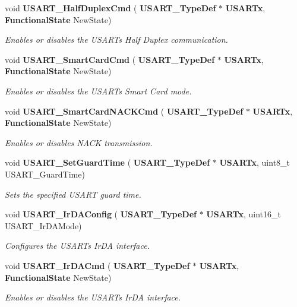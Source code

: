 \begin{DoxyCompactItemize}
void \textbf{ U\+S\+A\+R\+T\+\_\+\+Half\+Duplex\+Cmd} (\textbf{ U\+S\+A\+R\+T\+\_\+\+Type\+Def} $\ast$\textbf{ U\+S\+A\+R\+Tx}, \textbf{ Functional\+State} New\+State)
\begin{DoxyCompactList}\small\item\em Enables or disables the U\+S\+A\+RT\textquotesingle{}s Half Duplex communication. \end{DoxyCompactList}\item 
void \textbf{ U\+S\+A\+R\+T\+\_\+\+Smart\+Card\+Cmd} (\textbf{ U\+S\+A\+R\+T\+\_\+\+Type\+Def} $\ast$\textbf{ U\+S\+A\+R\+Tx}, \textbf{ Functional\+State} New\+State)
\begin{DoxyCompactList}\small\item\em Enables or disables the U\+S\+A\+RT\textquotesingle{}s Smart Card mode. \end{DoxyCompactList}\item 
void \textbf{ U\+S\+A\+R\+T\+\_\+\+Smart\+Card\+N\+A\+C\+K\+Cmd} (\textbf{ U\+S\+A\+R\+T\+\_\+\+Type\+Def} $\ast$\textbf{ U\+S\+A\+R\+Tx}, \textbf{ Functional\+State} New\+State)
\begin{DoxyCompactList}\small\item\em Enables or disables N\+A\+CK transmission. \end{DoxyCompactList}\item 
void \textbf{ U\+S\+A\+R\+T\+\_\+\+Set\+Guard\+Time} (\textbf{ U\+S\+A\+R\+T\+\_\+\+Type\+Def} $\ast$\textbf{ U\+S\+A\+R\+Tx}, uint8\+\_\+t U\+S\+A\+R\+T\+\_\+\+Guard\+Time)
\begin{DoxyCompactList}\small\item\em Sets the specified U\+S\+A\+RT guard time. \end{DoxyCompactList}\item 
void \textbf{ U\+S\+A\+R\+T\+\_\+\+Ir\+D\+A\+Config} (\textbf{ U\+S\+A\+R\+T\+\_\+\+Type\+Def} $\ast$\textbf{ U\+S\+A\+R\+Tx}, uint16\+\_\+t U\+S\+A\+R\+T\+\_\+\+Ir\+D\+A\+Mode)
\begin{DoxyCompactList}\small\item\em Configures the U\+S\+A\+RT\textquotesingle{}s Ir\+DA interface. \end{DoxyCompactList}\item 
void \textbf{ U\+S\+A\+R\+T\+\_\+\+Ir\+D\+A\+Cmd} (\textbf{ U\+S\+A\+R\+T\+\_\+\+Type\+Def} $\ast$\textbf{ U\+S\+A\+R\+Tx}, \textbf{ Functional\+State} New\+State)
\begin{DoxyCompactList}\small\item\em Enables or disables the U\+S\+A\+RT\textquotesingle{}s Ir\+DA interface. \end{DoxyCompactList}\item 

\end{DoxyCompactItemize}
